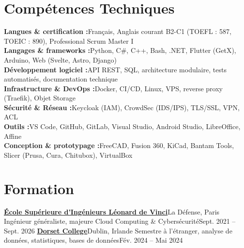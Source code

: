 \documentclass[letterpaper,11pt]{article}
\begin{document}
\section{Compétences Techniques}
 \begin{itemize}[leftmargin=0.15in, label={}]
    \small{\item{
    \textbf{Langues \& certification :}{Français, Anglais courant B2-C1 (TOEFL : 587, TOEIC : 890), Professional Scrum Master I} \\
    \textbf{Langages \& frameworks :}{Python, C\#, C++, Bash, .NET, Flutter (GetX), Arduino, Web (Svelte, Astro, Django)} \\
    \textbf{Développement logiciel :}{API REST, SQL, architecture modulaire, tests automatisés, documentation technique} \\
    \textbf{Infrastructure \& DevOps :}{Docker, CI/CD, Linux, VPS, reverse proxy (Traefik), Objet Storage} \\
    \textbf{Sécurité \& Réseau :}{Keycloak (IAM), CrowdSec (IDS/IPS), TLS/SSL, VPN, ACL} \\
    \textbf{Outils :}{VS Code, GitHub, GitLab, Visual Studio, Android Studio, LibreOffice, Affine} \\
    \textbf{Conception \& prototypage :}{FreeCAD, Fusion 360, KiCad, Bantam Tools, Slicer (Prusa, Cura, Chitubox), VirtualBox}
    }}
 \end{itemize}

\section{Formation}
  \resumeSubHeadingListStart
  \resumeSubheading
  {\href{https://www.esilv.fr/}{\textbf{École Supérieure d'Ingénieurs Léonard de Vinci}}}{La Défense, Paris}
  {Ingénieur généraliste, majeure Cloud Computing \& Cybersécurité}{Sept. 2021 -- Sept. 2026}
  \resumeSubheading
    {\href{https://dorset.ie/}{\textbf{Dorset College}}}{Dublin, Irlande}
    {Semestre à l'étranger, analyse de données, statistiques, bases de données}{Fév. 2024 -- Mai 2024}
  \resumeSubHeadingListEnd
\end{document}

